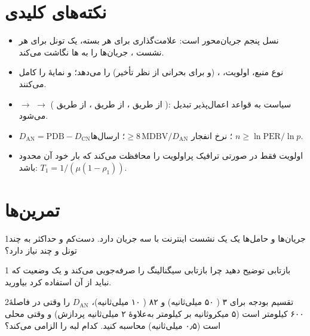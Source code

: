 \documentclass[11pt,a4paper]{article}
\begin{document}
\section{نکته‌های کلیدی}
\begin{takeawaybox}
\begin{itemize}
  \item {} نسل پنجم جریان‌محور است: علامت‌گذاری  برای هر بسته، یک تونل  برای هر نشست ،  جریان‌ها را به
        ها نگاشت می‌کند.
  \item {} نوع منبع، اولویت، ،  (و  برای  بحرانی از نظر تأخیر) را می‌دهد؛  و  نمایهٔ
         را کامل می‌کنند.
  \item {} $\to$  $\to$ ( از طریق ،  از طریق ،  از طریق ): سیاست به قواعد اعمال‌پذیر
        تبدیل می‌شود.
  \item $D_{\mathrm{AN}} = \mathrm{PDB} - D_{\mathrm{CN}}$؛ نرخ انفجار $\ge 8\,\mathrm{MDBV}/D_{\mathrm{AN}}$؛ ارسال‌ها $n \ge \ln\mathrm{PER}/\ln p$.
  \item اولویت فقط در صورتی ترافیک پراولویت را محافظت می‌کند که بار خود آن محدود باشد: $T_1 = 1/(\mu(1-\rho_1))$.
\end{itemize}
\end{takeawaybox}

\section{تمرین‌ها}

\begin{exercisebox}{1}{جریان‌ها و حامل‌ها}\label{exr:flows}
یک  یک نشست  اینترنت با سه جریان  دارد. دست‌کم و حداکثر به چند تونل  و چند  نیاز دارد؟
\end{exercisebox}

\begin{exercisebox}{1}{ بازتابی}\label{exr:rq}
توضیح دهید چرا  بازتابی سیگنالینگ را صرفه‌جویی می‌کند و یک وضعیت که نباید از آن استفاده کرد بیاورید.
\end{exercisebox}

\begin{exercisebox}{2}{تقسیم بودجه}\label{exr:pdb}
برای  ۳ ( ۵۰ میلی‌ثانیه) و  ۸۲ ( ۱۰ میلی‌ثانیه)، $D_{\mathrm{AN}}$ را وقتی  در فاصلهٔ ۶۰۰ کیلومتر است
(۵ میکروثانیه بر کیلومتر به‌علاوهٔ ۲ میلی‌ثانیه پردازش) و وقتی محلی است (۰٫۵ میلی‌ثانیه) محاسبه کنید. کدام   لبه را الزامی
می‌کند؟
\end{exercisebox}
\end{document}
